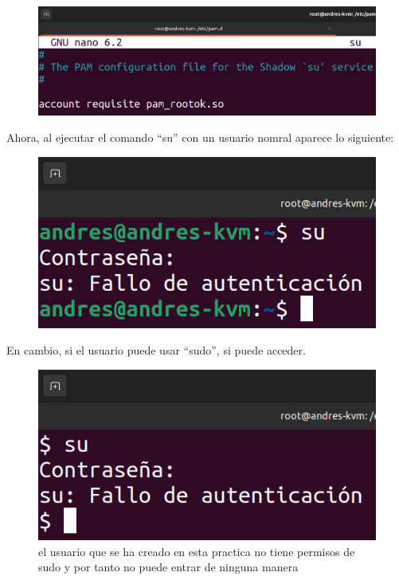 \documentclass{article}
\begin{document}
\begin{figure}[H]
    \includegraphics[width=\textwidth]{imagenes/sudeny.png}
\end{figure}

Ahora, al ejecutar el comando ``su'' con un usuario nomral aparece lo siguiente:

\begin{figure}[H]
    \includegraphics[width=\textwidth]{imagenes/sudenyuser.png}
\end{figure}


En cambio, si el usuario puede usar ``sudo'', si puede acceder.

\begin{figure}[H]
    \includegraphics[width=\textwidth]{imagenes/sudenyuserprueba.png}
    \caption{el usuario que se ha creado en esta practica no tiene permisos de sudo y por tanto no puede entrar de ninguna manera}
\end{figure}
\end{document}
